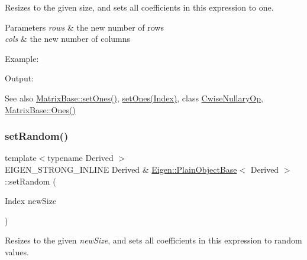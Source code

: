 Resizes to the given size, and sets all coefficients in this expression to one.


\begin{DoxyParams}{Parameters}
{\em rows} & the new number of rows \\
\hline
{\em cols} & the new number of columns\\
\hline
\end{DoxyParams}
Example\+: 
\begin{DoxyCodeInclude}{0}
\end{DoxyCodeInclude}
 Output\+: 
\begin{DoxyVerbInclude}
\end{DoxyVerbInclude}


\begin{DoxySeeAlso}{See also}
\mbox{\hyperlink{class_eigen_1_1_dense_base_ad18970fd7d9f9c3d8db9d05fa8652a25}{Matrix\+Base\+::set\+Ones()}}, \mbox{\hyperlink{class_eigen_1_1_plain_object_base_a2871e88e1feb1cc665fa1f1cc800078b}{set\+Ones(\+Index)}}, class \mbox{\hyperlink{class_eigen_1_1_cwise_nullary_op}{Cwise\+Nullary\+Op}}, \mbox{\hyperlink{class_eigen_1_1_dense_base_a1284a38971d817c33e40c226f6347e37}{Matrix\+Base\+::\+Ones()}} 
\end{DoxySeeAlso}
\mbox{\label{class_eigen_1_1_plain_object_base_af0e576a0e1aefc9ee346de44cc352ba3}} 
\subsubsection{\texorpdfstring{setRandom()}{setRandom()}\hspace{0.1cm}{\footnotesize\ttfamily [1/2]}}
{\footnotesize\ttfamily template$<$typename Derived $>$ \\
E\+I\+G\+E\+N\+\_\+\+S\+T\+R\+O\+N\+G\+\_\+\+I\+N\+L\+I\+NE Derived \& \mbox{\hyperlink{class_eigen_1_1_plain_object_base}{Eigen\+::\+Plain\+Object\+Base}}$<$ Derived $>$\+::set\+Random (\begin{DoxyParamCaption}\item[{Index}]{new\+Size }\end{DoxyParamCaption})}

Resizes to the given {\itshape new\+Size}, and sets all coefficients in this expression to random values.

